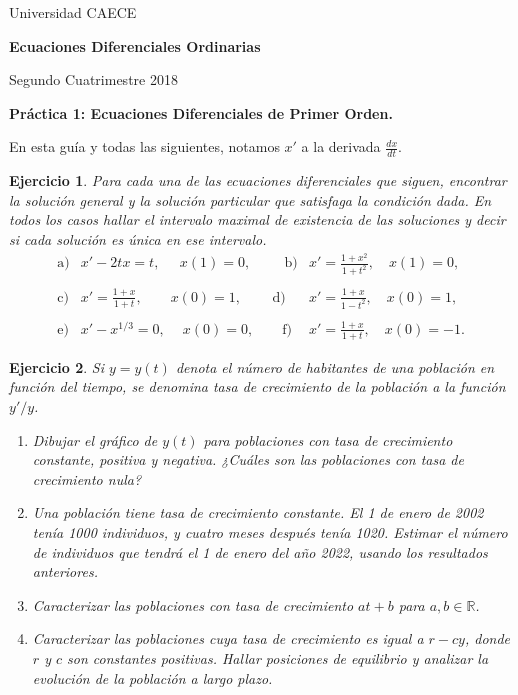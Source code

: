 \documentclass[11pt,a4paper,pdftex]{amsart}
\newtheorem{ej}{Ejercicio}%
\numberwithin{equation}{section}%
\newcommand{\bej}[1]{\begin{ej}\rm{#1}}
\newcommand{\eej}{\end{ej}\vspace{-0.2cm}}
\renewcommand{\bf}{\textbf}
\newcommand{\di}{\displaystyle}
\newcommand{\R}{\mathbb R}
\newcommand{\0}{\mathbb O}
\newcommand{\8}{\infty}
\begin{document}

\centerline{{\small Universidad CAECE}}

 \vskip 0.2cm
 \hrulefill
 \vskip 0.2cm

 \centerline{{\bf{\Large{\sc Ecuaciones Diferenciales Ordinarias}}}}
 \vskip 0.2cm
 \centerline{\ttfamily Segundo Cuatrimestre 2018}
 \hrulefill

 \medskip
 \centerline{\bf {Práctica 1: Ecuaciones Diferenciales de Primer Orden.}}
 \medskip

En esta guía y todas las siguientes, notamos $x'$ a la derivada 
$\frac{dx}{dt}$.

\bej Para cada una de las ecuaciones diferenciales que siguen, encontrar la 
solución general y la soluci\'on  particular que satisfaga la condici\'on 
dada. En todos los casos hallar el intervalo maximal de existencia de las 
soluciones y decir si cada solución es única en ese intervalo. 
\[
\begin{array}{llll}
\mbox{a)}&x'-2tx=t,\ \, \quad x(1)=0,\qquad
\ \, \mbox{b)}&x'=\di\frac{1+x^2}{1+t^2},\quad x(1)=0,\\
\\
\mbox{c)}&x'=\di
\frac{1+x}{1+t}, \qquad x(0)=1,\qquad
\,\mbox{d)}&x'=\di\frac{1+x}{1-t^2}, \quad x(0)=1, \\
\\
\mbox{e)} &x'-x^{1/3}=0,\ \quad x(0)=0, \qquad
\mbox{f)}&x'=\di\frac{1+x}{1+t}, \quad x(0)=-1.
\end{array}
\]

\eej

\bigskip
\bej Si $y=y(t)$ denota el n\'umero de habitantes de una poblaci\'on en 
funci\'on del tiempo, se denomina tasa de cre\-ci\-miento de la poblaci\'on a 
la funci\'on $y'/y$.

\begin{enumerate}
\item[(a)] Dibujar el gr\'afico de $y(t)$ para poblaciones con tasa de
crecimiento cons\-tante, positiva y negativa. ¿Cu\'ales son las poblaciones 
con tasa de crecimiento nula?

\item[(b)] Una población tiene tasa de crecimiento constante. El 1 de
enero de 2002 tenía 1000 individuos, y cuatro meses despu\'es
tenía 1020. Estimar el número de individuos que tendr\'a el
1 de enero del año 2022, usando los resultados anteriores.

\item[(e)] Caracterizar las poblaciones con tasa de crecimiento $at + b$ para
$a,b \in \R$.

\item[(f)] Caracterizar las poblaciones cuya tasa de crecimiento es
igual a $r-cy$, donde $r$ y $c$ son constantes positivas. Hallar posiciones
de equilibrio y analizar la evolución de la población a largo plazo.
\end{enumerate}
\eej
\end{document}
